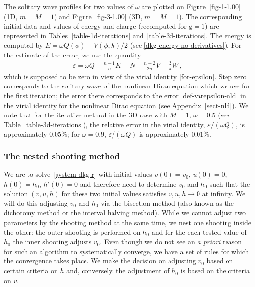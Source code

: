 \documentclass[12pt]{extarticle}
\newcommand{\coupling}{\mathrm{g}}
\theoremstyle{plain}
\theoremstyle{remark}
\begin{document}
The solitary wave profiles for two values of $\omega$
are plotted on
Figure~\ref{fig-1-1.00}
(1D, $m=M=1$)
and
Figure~\ref{fig-3-1.00}
(3D, $m=M=1$).
The corresponding initial data and values of energy and charge
(recomputed for $\coupling=1$)
are represented in Tables~\ref{table-1d-iterations}
and~\ref{table-3d-iterations}.
The energy
is computed by
$E=\omega Q(\phi)-V(\phi,h)/2$
(see \eqref{dkg-energy-no-derivatives}).
For the estimate of the error,
we use the quantity
\begin{align}
\label{def-varepsilon}
\varepsilon=
\omega Q-\frac{n-1}{n}K-N-\frac{n+2}{2n}V
-\frac{2}{n}W\,,
\end{align}
which is supposed to be zero
in view of the virial identity
\eqref{for-epsilon}.
Step zero
corresponds to the solitary wave
of the nonlinear Dirac equation
which we use for the first iteration; the error there
corresponds to the error
\eqref{def-varepsilon-nld}
in the virial identity for the
nonlinear Dirac equation
(see Appendix~\ref{sect-nld}).
We note that
for the iterative method
in the 3D case with $M=1$, $\omega=0.5$
(see Table~\ref{table-3d-iterations}),
the relative error in the virial identity,
$\varepsilon/(\omega Q)$, is approximately $0.05\%$;
for $\omega=0.9$,
$\varepsilon/(\omega Q)$ is approximately $0.01\%$.




\subsubsection*{The nested shooting method}

We are to solve~\eqref{system-dkg-r} with initial values $v(0)=v_0$,
$u(0)=0$,
$h(0)=h_0$, $h'(0)=0$
and therefore need to determine $v_0$ and $h_0$ such that the solution $(v, u, h)$ for these two initial values satisfies $v, u, h \to 0$ at infinity.
We will do this adjusting
$v_0$ and $h_0$ via the bisection method
(also known as the dichotomy method or the interval halving method).
While we cannot
adjust two parameters by the shooting method at the same time,
we nest one shooting inside the other: the outer shooting is performed on $h_0$ and for the each tested value of $h_0$ the inner shooting adjusts $v_0$.
Even though we do not see
an \emph{a priori}
reason for such an algorithm to systematically converge, we have a set of rules
for which the convergence takes place.
We make the decision on adjusting
$v_0$ based on certain criteria on $h$ and, conversely, the adjustment of $h_0$
is based on the criteria on $v$.
\end{document}
